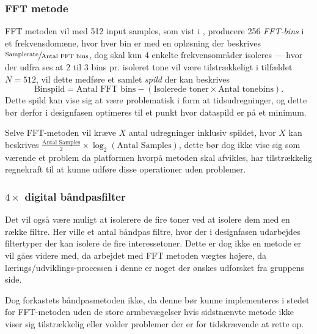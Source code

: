 {\subsubsection{FFT metode}
FFT metoden vil med 512 input samples, som vist i , producere 256 \emph{FFT-bins}\cite{DigitalSignalProcessing} i et frekvensdomæne, hvor hver bin er med en opløsning der beskrives $\sfrac{\textrm{Samplerate}}{\textrm{Antal FFT bins}}$, dog skal kun 4 enkelte frekvensområder isoleres --- hvor der udfra  ses at 2 til 3 bins pr. isoleret tone vil være tilstrækkeligt i tilfældet $N=512$, vil dette medføre et samlet \emph{spild} der kan beskrives \[\textrm{Binspild} = \textrm{Antal FFT bins} - (\textrm{Isolerede toner} \times  \textrm{Antal tonebins}).\]
Dette spild kan vise sig at være problematisk i form at tidsudregninger, og dette bør derfor i designfasen optimeres til et punkt hvor dataspild er på et minimum. 

Selve FFT-metoden vil kræve $X$ antal udregninger inklusiv spildet, hvor $X$ kan beskrives 
\(\tfrac{\textrm{Antal Samples}}{2} \times  \log_2 (\textrm{Antal Samples})\), dette bør dog ikke vise sig som værende et problem da platformen hvorpå metoden skal afvikles, har tilstrækkelig regnekraft til at kunne udføre disse operationer uden problemer\cite{Bronshtein2015,PSoC5LPDatasheet}.

\subsubsection{$4 \times$ digital båndpasfilter}

Det vil også være muligt at isolerere de fire toner ved at isolere dem med en række filtre. Her ville et antal båndpas filtre, hvor der i designfasen udarbejdes filtertyper der kan isolere de fire interessetoner.
Dette er dog ikke en metode er vil gåes videre med, da arbejdet med FFT metoden vægtes højere, da lærings/udviklings-processen i denne er noget der ønskes udforsket fra gruppens side.

Dog forkastets båndpasmetoden ikke, da denne bør kunne implementeres i stedet for FFT-metoden uden de store armbevægelser hvis sidstnænvte metode ikke viser sig tilstrækkelig eller volder problemer der er for tidskrævende at rette op.

}






















